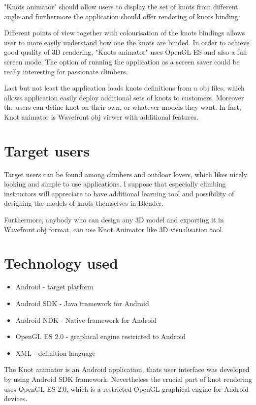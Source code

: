 "Knots animator" should  allow users to display the set of knots from different angle
and furthermore the application should offer rendering of knots binding.

Different points of view together with colourisation of the knots bindings
allows user to more easily understand how one the knots are binded.
In order to achieve good quality of 3D rendering, "Knots animator" 
uses OpenGL ES and also a full screen mode. 
The option of running the application as a screen saver could be really interesting
for passionate climbers.

Last but not least the application loads knots definitions from a obj files,
which allows application easily deploy additional sets of knots to customers.
Moreover the users can define knot on their own, or whatever models they want.
In fact, Knot animator is Wavefront obj viewer with additional features.

\section*{Target users} %
\label{sec:Target users}
Target users can be found among climbers and outdoor lovers,
which likes nicely looking and simple to use applications.  
I suppose that especially climbing instructors will appreciate
to have additional learning tool and possibility 
of designing the models of knots themselves in Blender. 

Furthermore, anybody who can design any 3D model and exporting it in Wavefront obj
format, can use Knot Animator like 3D visualisation tool.

\section*{Technology used} %
\label{sec:Technology used}

\begin{itemize}
  \item Android - target platform 
  \item Android SDK - Java framework for Android
  \item Android NDK - Native framework for Android
  \item OpenGL ES 2.0 - graphical engine restricted to Android
  \item XML - definition language 
\end{itemize}

The Knot animator is an Android application, 
thats user interface was developed by using Android SDK framework.
Nevertheless the crucial part of knot rendering uses OpenGL ES 2.0,
which is a restricted OpenGL graphical engine for Android devices.

